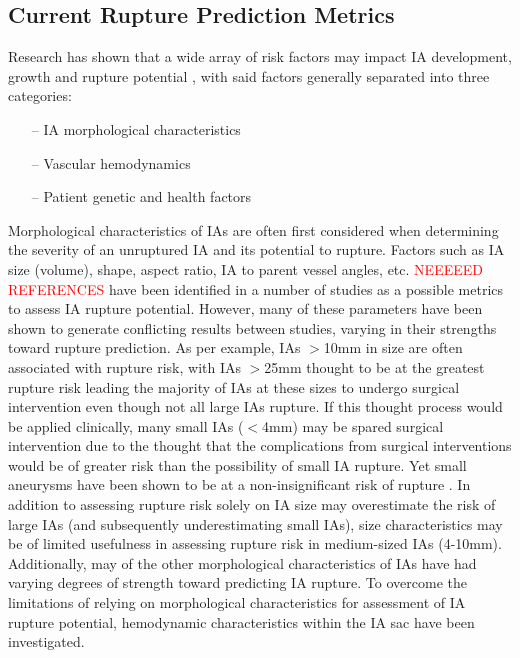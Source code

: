 \subsection{Current Rupture Prediction Metrics}
Research has shown that a wide array of risk factors may impact IA development, growth and rupture potential \cite{Korja2014,penn2014role,starke2014tumor,diagbouga2018role}, with said factors generally separated into three categories:
	\begin{itemize}
  		\item[--] IA morphological characteristics
 	    \item[--] Vascular hemodynamics
 	    \item[--] Patient genetic and health factors
	\end{itemize}

Morphological characteristics of IAs are often first considered when determining the severity of an unruptured IA and its potential to rupture. Factors such as IA size (volume), shape, aspect ratio, IA to parent vessel angles, etc. \textcolor{red}{NEEEEED REFERENCES} have been identified in a number of studies as a possible metrics to assess IA rupture potential. However, many of these parameters have been shown to generate conflicting results between studies, varying in their strengths toward rupture prediction. As per example, IAs $>$10mm in size are often associated with rupture risk, with IAs $>$25mm thought to be at the greatest rupture risk leading the majority of IAs at these sizes to undergo surgical intervention\cite{Xiang2011WSS,mocco2018aneurysm,wermer2007risk} even though not all large IAs rupture. If this thought process would be applied clinically, many small IAs ($<$4mm) may be spared surgical intervention due to the thought that the complications from surgical interventions would be of greater risk than the possibility of small IA rupture. Yet small aneurysms have been shown to be at a non-insignificant risk of rupture \cite{duan2018morphological}. In addition to assessing rupture risk solely on IA size may overestimate the risk of large IAs (and subsequently underestimating small IAs), size characteristics may be of limited usefulness in assessing rupture risk in medium-sized IAs (4-10mm). Additionally, may of the other morphological characteristics of IAs have had varying degrees of strength toward predicting IA rupture\cite{brinjikji2015risk,Backes2016,Jing2015}. To overcome the limitations of relying on morphological characteristics for assessment of IA rupture potential, hemodynamic characteristics within the IA sac have been investigated.

